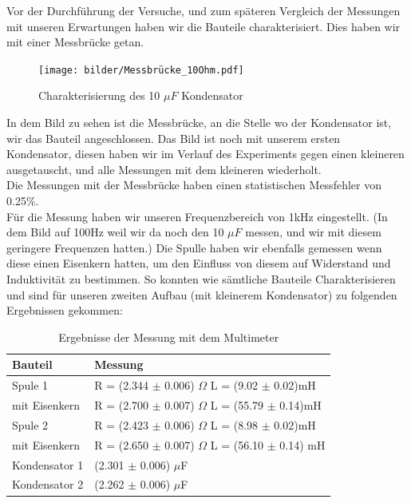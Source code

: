 \documentclass[twoside]{protokoll}
\begin{document}
Vor der Durchführung der Versuche, und zum späteren Vergleich der Messungen mit unseren Erwartungen haben wir die Bauteile charakterisiert. Dies haben wir mit einer Messbrücke getan. 

\begin{figure}[H]
    \centering
    \texttt{[image: bilder/Messbrücke\_10Ohm.pdf]}
    \caption{Charakterisierung des 10 $\mu F$ Kondensator}
\end{figure}

In dem Bild zu sehen ist die Messbrücke, an die Stelle wo der Kondensator ist, wir das Bauteil angeschlossen. Das Bild ist noch mit unserem ersten Kondensator, diesen haben wir im Verlauf des Experiments gegen einen kleineren ausgetauscht, und alle Messungen mit dem kleineren wiederholt.\\

Die Messungen mit der Messbrücke haben einen statistischen Messfehler von 0.25\%.\\
Für die Messung haben wir unseren Frequenzbereich von 1kHz eingestellt.
 (In dem Bild auf 100Hz weil wir da noch den 10 $\mu F$ messen, und wir mit diesem geringere Frequenzen hatten.) 
 Die Spulle haben wir ebenfalls gemessen wenn diese einen Eisenkern hatten, um den Einfluss von diesem auf Widerstand und Induktivität zu bestimmen.
So konnten wie sämtliche Bauteile Charakterisieren und sind für unseren zweiten Aufbau (mit kleinerem Kondensator) zu folgenden Ergebnissen gekommen:\\
    
\begin{table}[H]
        \centering
        \begin{tabularx}{1.0\textwidth}{X l} %
            \toprule
            \textbf{Bauteil} & \textbf{Messung} \\
            \midrule
            Spule 1 & R = (2.344 $\pm$ 0.006) $\Omega$ \quad L = (9.02 $\pm$ 0.02)mH \\
            mit Eisenkern & R = (2.700 $\pm$ 0.007) $\Omega$ \quad L = (55.79 $\pm$ 0.14)mH \\
            \midrule
            Spule 2 & R = (2.423 $\pm$ 0.006) $\Omega$ \quad L = (8.98 $\pm$ 0.02)mH \\
            mit Eisenkern & R = (2.650 $\pm$ 0.007) $\Omega$ \quad L = (56.10 $\pm$ 0.14) mH \\
            \midrule
            Kondensator 1 & (2.301 $\pm$ 0.006) $\mu$F \\
            Kondensator 2 & (2.262 $\pm$ 0.006) $\mu$F \\
            \bottomrule
        \end{tabularx}
        \caption{Ergebnisse der Messung mit dem Multimeter}
        \label{tab:mytable}
    \end{table}
\end{document}
